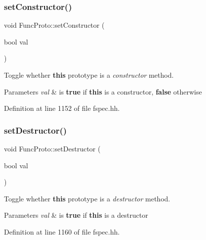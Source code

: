 \subsubsection{\texorpdfstring{setConstructor()}{setConstructor()}}
{\footnotesize\ttfamily void Func\+Proto\+::set\+Constructor (\begin{DoxyParamCaption}\item[{bool}]{val }\end{DoxyParamCaption})\hspace{0.3cm}{\ttfamily [inline]}}



Toggle whether {\bfseries{this}} prototype is a {\itshape constructor} method. 


\begin{DoxyParams}{Parameters}
{\em val} & is {\bfseries{true}} if {\bfseries{this}} is a constructor, {\bfseries{false}} otherwise \\
\hline
\end{DoxyParams}


Definition at line 1152 of file fspec.\+hh.

\mbox{\label{class_func_proto_aa191f5c52ce98ba14ef14f63a763a7da}} 
\subsubsection{\texorpdfstring{setDestructor()}{setDestructor()}}
{\footnotesize\ttfamily void Func\+Proto\+::set\+Destructor (\begin{DoxyParamCaption}\item[{bool}]{val }\end{DoxyParamCaption})\hspace{0.3cm}{\ttfamily [inline]}}



Toggle whether {\bfseries{this}} prototype is a {\itshape destructor} method. 


\begin{DoxyParams}{Parameters}
{\em val} & is {\bfseries{true}} if {\bfseries{this}} is a destructor \\
\hline
\end{DoxyParams}


Definition at line 1160 of file fspec.\+hh.

\mbox{\label{class_func_proto_a6d237b521223b740d5d052b68966b556}} 

